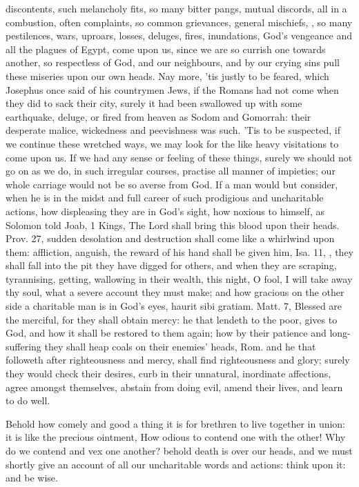 {discontents, such melancholy fits, so many bitter pangs, mutual
discords, all in a combustion, often complaints, so common grievances,
general mischiefs, , so many pestilences, wars, uproars,
losses, deluges, fires, inundations, God's vengeance and all the
plagues of Egypt, come upon us, since we are so currish one towards
another, so respectless of God, and our neighbours, and by our crying
sins pull these miseries upon our own heads. Nay more, 'tis justly to
be feared, which Josephus once said of his countrymen Jews, if
the Romans had not come when they did to sack their city, surely it had
been swallowed up with some earthquake, deluge, or fired from heaven as
Sodom and Gomorrah: their desperate malice, wickedness and peevishness
was such. 'Tis to be suspected, if we continue these wretched ways, we
may look for the like heavy visitations to come upon us. If we had any
sense or feeling of these things, surely we should not go on as we do,
in such irregular courses, practise all manner of impieties; our whole
carriage would not be so averse from God. If a man would but consider,
when he is in the midst and full career of such prodigious and
uncharitable actions, how displeasing they are in God's sight, how
noxious to himself, as Solomon told Joab, 1 Kings,  The Lord shall
bring this blood upon their heads. Prov.  27, sudden desolation and
destruction shall come like a whirlwind upon them: affliction, anguish,
the reward of his hand shall be given him, Isa.  11, \etc{}, they
shall fall into the pit they have digged for others, and when they are
scraping, tyrannising, getting, wallowing in their wealth, this night,
O fool, I will take away thy soul, what a severe account they must
make; and how gracious on the other side a charitable man is in
God's eyes, haurit sibi gratiam. Matt.  7, Blessed are the merciful,
for they shall obtain mercy: he that lendeth to the poor, gives to God,
and how it shall be restored to them again; how by their patience and
long-suffering they shall heap coals on their enemies' heads, Rom. 
and he that followeth after righteousness and mercy, shall find
righteousness and glory; surely they would check their desires, curb in
their unnatural, inordinate affections, agree amongst themselves,
abstain from doing evil, amend their lives, and learn to do well.

Behold how comely and good a thing it is for brethren to live together
in union: it is like the precious ointment, \etc{} How odious to
contend one with the other!   Why do we contend and
vex one another? behold death is over our heads, and we must shortly
give an account of all our uncharitable words and actions: think upon
it: and be wise.
}

